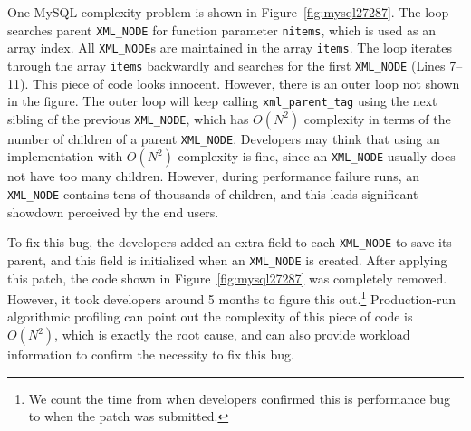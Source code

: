 


One MySQL complexity problem is shown in Figure~\ref{fig:mysql27287}.
The loop searches parent \texttt{XML\_NODE} for function parameter \texttt{nitems},
which is used as an array index. 
All \texttt{XML\_NODE}s are maintained in the array \texttt{items}.
The loop iterates through the array \texttt{items}
backwardly and searches for the first \texttt{XML\_NODE} 
 (Lines 7--11).
This piece of code looks innocent.
However, there is an outer loop not shown in the figure.
The outer loop will keep calling \texttt{xml\_parent\_tag} using
the next sibling of the previous \texttt{XML\_NODE},
which has $O(N^2)$ complexity in terms of the number of children of a parent \texttt{XML\_NODE}.
Developers may think that using an implementation with $O(N^2)$ complexity is fine,
since an \texttt{XML\_NODE} usually does not have too many children.
However, during performance failure runs,
an \texttt{XML\_NODE} contains tens of thousands of children,
and this leads significant showdown perceived by the end users.

To fix this bug, the developers added an extra field to each \texttt{XML\_NODE} to save its parent,
and this field is initialized when an \texttt{XML\_NODE} is created.
After applying this patch, the code shown in Figure~\ref{fig:mysql27287} was completely removed.
However, it took developers around 5 months to figure this
out.\footnote{We count the time from when developers confirmed this is performance bug
to when the patch was submitted.}
Production-run algorithmic profiling 
can point out the complexity of this piece of code is $O(N^2)$, 
which is exactly the root cause, 
and can also provide workload information 
to confirm the necessity to fix this bug.


